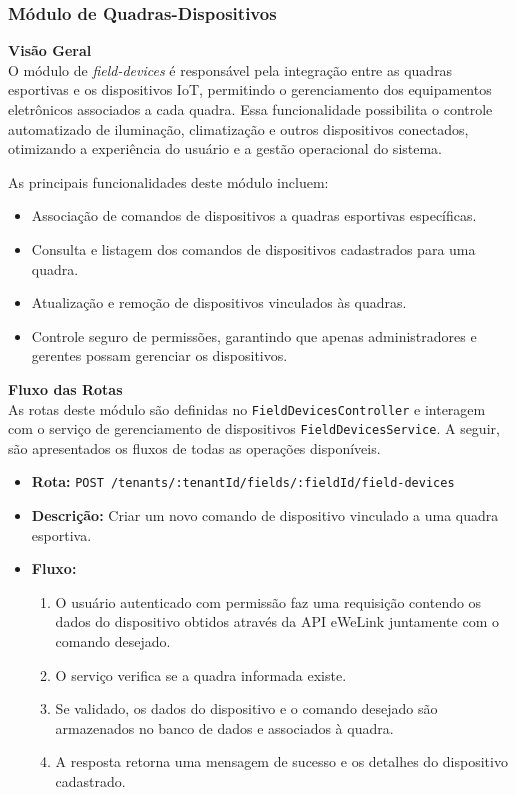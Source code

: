 \subsubsection{Módulo de Quadras-Dispositivos}\label{subsubsec:modulo_quadras_dispositivos}

\noindent\textbf{Visão Geral}\\
O módulo de \textit{field-devices} é responsável pela integração entre as quadras esportivas e os dispositivos IoT, permitindo o gerenciamento dos equipamentos eletrônicos associados a cada quadra. Essa funcionalidade possibilita o controle automatizado de iluminação, climatização e outros dispositivos conectados, otimizando a experiência do usuário e a gestão operacional do sistema.

As principais funcionalidades deste módulo incluem:

\begin{itemize}
\item Associação de comandos de dispositivos a quadras esportivas específicas.
\item Consulta e listagem dos comandos de dispositivos cadastrados para uma quadra.
\item Atualização e remoção de dispositivos vinculados às quadras.
\item Controle seguro de permissões, garantindo que apenas administradores e gerentes possam gerenciar os dispositivos.
\end{itemize}

\noindent\textbf{Fluxo das Rotas}\\
As rotas deste módulo são definidas no \texttt{FieldDevicesController} e interagem com o serviço de gerenciamento de dispositivos \texttt{FieldDevicesService}. A seguir, são apresentados os fluxos de todas as operações disponíveis.

\begin{itemize}
\item \textbf{Rota:} \texttt{POST /tenants/:tenantId/fields/:fieldId/field-devices}
\item \textbf{Descrição:} Criar um novo comando de dispositivo vinculado a uma quadra esportiva.
\item \textbf{Fluxo:}
\begin{enumerate}
\item O usuário autenticado com permissão faz uma requisição contendo os dados do dispositivo obtidos através da API eWeLink juntamente com o comando desejado.
\item O serviço verifica se a quadra informada existe.
\item Se validado, os dados do dispositivo e o comando desejado são armazenados no banco de dados e associados à quadra.
\item A resposta retorna uma mensagem de sucesso e os detalhes do dispositivo cadastrado.
\end{enumerate}
\end{itemize}

